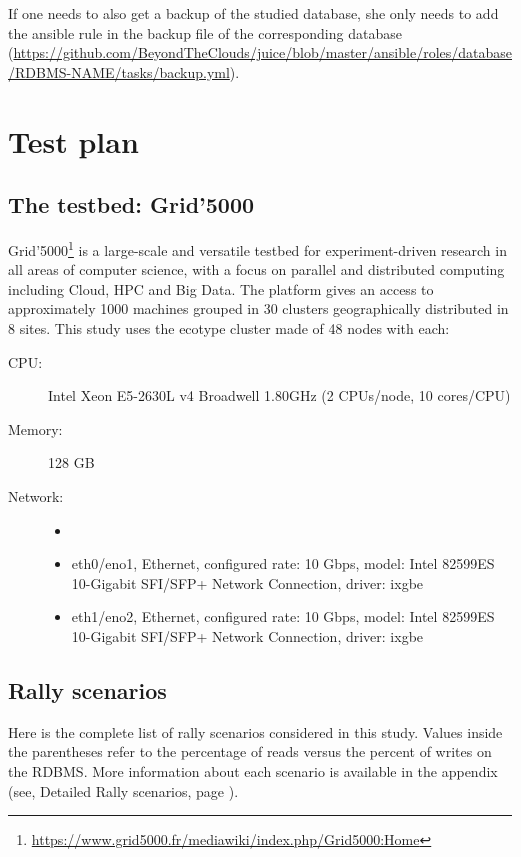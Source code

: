 If one needs to also get a backup of the studied database, she only needs to add the ansible rule in the backup file of the corresponding database (\url{https://github.com/BeyondTheClouds/juice/blob/master/ansible/roles/database/RDBMS-NAME/tasks/backup.yml}).


\section{Test plan}
\label{sec:testplan}
\subsection{The testbed: Grid'5000}
Grid’5000\footnote{\url{https://www.grid5000.fr/mediawiki/index.php/Grid5000:Home}} is a large-scale and versatile testbed for experiment-driven research in all areas of computer science, with a focus on parallel and distributed computing including Cloud, HPC and Big Data. The platform gives an access to approximately 1000 machines grouped in 30 clusters geographically distributed in 8 sites. This study uses the ecotype cluster made of 48 nodes with each:

\begin{description}
    \item[CPU:] Intel Xeon E5-2630L v4 Broadwell 1.80GHz (2 CPUs/node, 10 cores/CPU)
    \item[Memory:] 128 GB
    \item[Network:]
      \begin{itemize}
        \item[]
        \item eth0/eno1, Ethernet, configured rate: 10 Gbps, model: Intel 82599ES 10-Gigabit SFI/SFP+ Network Connection, driver: ixgbe
        \item eth1/eno2, Ethernet, configured rate: 10 Gbps, model: Intel 82599ES 10-Gigabit SFI/SFP+ Network Connection, driver: ixgbe
      \end{itemize}
\end{description}

\subsection{Rally scenarios}
\label{rally-scenarios}
Here is the complete list of rally scenarios considered in this study. Values inside the parentheses refer to the percentage of reads versus the percent of writes on the RDBMS. More information about each scenario is available in the appendix (see, Detailed Rally scenarios, page \pageref{sec:detail-rally}).

